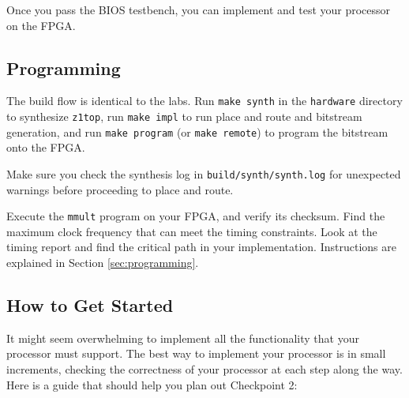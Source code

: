 Once you pass the BIOS testbench, you can implement and test your processor on the FPGA.


\subsection{Programming}
The build flow is identical to the labs.
Run \verb|make synth| in the \verb|hardware| directory to synthesize \verb|z1top|,
run \verb|make impl| to run place and route and bitstream generation,
and run \verb|make program| (or \verb|make remote|) to program the bitstream onto the FPGA.

Make sure you check the synthesis log in \verb|build/synth/synth.log|
for unexpected warnings before proceeding to place and route.

Execute the \verb|mmult| program on your FPGA, and verify its checksum.
Find the maximum clock frequency that can meet the timing constraints.
Look at the timing report and find the critical path in your implementation.
Instructions are explained in Section \ref{sec:programming}.


\subsection{How to Get Started}
It might seem overwhelming to implement all the functionality that your processor must support. The best way to implement your processor is in small increments, checking the correctness of your processor at each step along the way. Here is a guide that should help you plan out Checkpoint 2:

